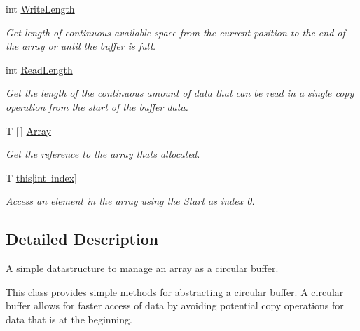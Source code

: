 \begin{DoxyCompactItemize}
int \mbox{\hyperlink{class_r_j_c_p_1_1_datastructures_1_1_circular_buffer_aea438c0f691cf035c02a7fdbce551e01}{Write\+Length}}
\begin{DoxyCompactList}\small\item\em Get length of continuous available space from the current position to the end of the array or until the buffer is full. \end{DoxyCompactList}\item 
int \mbox{\hyperlink{class_r_j_c_p_1_1_datastructures_1_1_circular_buffer_a8d1a90d644b39034c00441161506295a}{Read\+Length}}
\begin{DoxyCompactList}\small\item\em Get the length of the continuous amount of data that can be read in a single copy operation from the start of the buffer data. \end{DoxyCompactList}\item 
T \mbox{[}$\,$\mbox{]} \mbox{\hyperlink{class_r_j_c_p_1_1_datastructures_1_1_circular_buffer_a5479e52f4d48c74d313e078c10261c7b}{Array}}
\begin{DoxyCompactList}\small\item\em Get the reference to the array that\textquotesingle{}s allocated. \end{DoxyCompactList}\item 
T \mbox{\hyperlink{class_r_j_c_p_1_1_datastructures_1_1_circular_buffer_a9f027715c774d6a816a266473b8ff44c}{this\mbox{[}int index\mbox{]}}}
\begin{DoxyCompactList}\small\item\em Access an element in the array using the Start as index 0. \end{DoxyCompactList}\end{DoxyCompactItemize}


\subsection{Detailed Description}
A simple datastructure to manage an array as a circular buffer. 

This class provides simple methods for abstracting a circular buffer. A circular buffer allows for faster access of data by avoiding potential copy operations for data that is at the beginning. 

